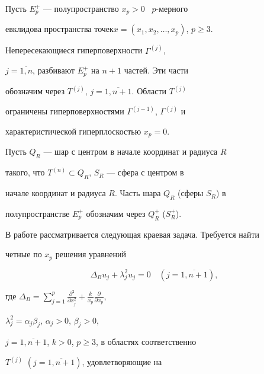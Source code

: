 \label{begin}











Пусть $E_p^{+}$ --- полупространство $x_p>0$ \ $p$-мерного


евклидова пространства точек\linebreak $x=(x_1,x_2,\dotsc,x_p)$, $p \geq 3$.


Непересекающиеся гиперповерхности $\Gamma^{(j)}$,


$j=\overline{1,n}$, разбивают $E_p^+$ на $n+1$ частей. Эти части


обозначим через $T^{(j)}$, $j=\overline{1,n+1}$. Области $T^{(j)}$


ограничены гиперповерхностями $\Gamma^{(j-1)}$, $\Gamma^{(j)}$ и


характеристической гиперплоскостью $x_p=0$.





Пусть $Q_R$ --- шар с центром в начале координат и радиуса $R$


такого, что $T^{(n)}\subset Q_R$, $S_R$ --- сфера с центром в


начале координат и радиуса $R$. Часть шара $Q_R$ (сферы $S_R$) в


полупространстве $E_p^+$ обозначим через $Q_R^+$ ($S_R^+$).





В работе рассматривается следующая краевая задача. Требуется найти


четные по $x_p$ решения уравнений


\begin{equation}


\Delta_B u_j+\lambda_j^2 u_j=0\quad (j=\overline{1,n+1}),


\end{equation}


где $\Delta_B=\sum \limits_{j=1}^{p}\frac{\partial ^2 }{\partial


x_j^2} +\frac{k}{x_p} \frac{\partial }{\partial x_p}$,


$\lambda_j^2=\alpha_j \beta_j$, $\alpha_j>0$, $\beta_j>0$,


$j=\overline{1,n+1}$, $k>0$, $p \geq 3$, в областях соответственно


$T^{(j)}$ $(j=\overline{1,n+1})$, удовлетворяющие на


